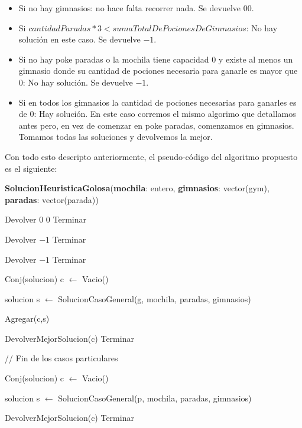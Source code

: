 \begin{itemize}

\item Si no hay gimnasios: no hace falta recorrer nada. Se devuelve $0 0$.

\item Si $cantidadParadas*3 < sumaTotalDePocionesDeGimnasios$: No hay solución en este caso. Se devuelve $-1$.

\item Si no hay poke paradas o la mochila tiene capacidad $0$ y existe al menos un gimnasio donde su cantidad de pociones necesaria para ganarle es mayor que $0$: No hay solución. Se devuelve $-1$.

\item Si en todos los gimnasios la cantidad de pociones necesarias para ganarles es de $0$: Hay solución. En este caso corremos el mismo algorimo que detallamos antes pero, en vez de comenzar en poke paradas, comenzamos en gimnasios. Tomamos todas las soluciones y devolvemos la mejor.

\end{itemize}

Con todo esto descripto anteriormente, el pseudo-código del algoritmo propuesto es el siguiente:

\begin{algorithm}[H]
\label{}
\caption{\textbf{SolucionHeuristicaGolosa}(\textbf{mochila}: entero, \textbf{gimnasios}: vector(gym), \textbf{paradas}: vector(parada))}
\begin{algorithmic}[1]

	\State Devolver $0$ $0$
	\State Terminar
\EndIf

	\State Devolver $-1$
	\State Terminar
\EndIf

	\State Devolver $-1$
	\State Terminar
\EndIf


	\State Conj(solucion) c $\leftarrow$ Vacio()


		\State solucion s $\leftarrow$ SolucionCasoGeneral(g, mochila, paradas, gimnasios)

		\State Agregar(c,s)

	\EndFor

	\State DevolverMejorSolucion(c)
	\State Terminar
\EndIf

\State
\State // Fin de los casos particulares
\State

\State Conj(solucion) c $\leftarrow$ Vacio()


	\State solucion s $\leftarrow$ SolucionCasoGeneral(p, mochila, paradas, gimnasios)

\EndFor

\State DevolverMejorSolucion(c)
\State Terminar

\medskip
\Statex \underline{}
\end{algorithmic}
\end{algorithm}


